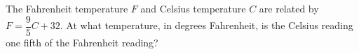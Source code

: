 The Fahrenheit temperature $F$ and Celsius temperature $C$ are related by $F=\dfrac{9}{5}C+32$. At what temperature, in degrees Fahrenheit, is the Celsius reading one fifth of the Fahrenheit reading?
